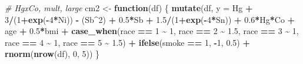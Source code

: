 \documentclass[12pt, twoside]{amherstthesis}
\newenvironment{Shaded}{\begin{snugshade}}{\end{snugshade}}
\newcommand{\AttributeTok}[1]{\textcolor[rgb]{0.13,0.29,0.53}{#1}}
\newcommand{\CommentTok}[1]{\textcolor[rgb]{0.56,0.35,0.01}{\textit{#1}}}
\newcommand{\ControlFlowTok}[1]{\textcolor[rgb]{0.13,0.29,0.53}{\textbf{#1}}}
\newcommand{\DecValTok}[1]{\textcolor[rgb]{0.00,0.00,0.81}{#1}}
\newcommand{\FloatTok}[1]{\textcolor[rgb]{0.00,0.00,0.81}{#1}}
\newcommand{\FunctionTok}[1]{\textcolor[rgb]{0.13,0.29,0.53}{\textbf{#1}}}
\newcommand{\NormalTok}[1]{#1}
\newcommand{\OtherTok}[1]{\textcolor[rgb]{0.56,0.35,0.01}{#1}}
\newcommand{\SpecialCharTok}[1]{\textcolor[rgb]{0.81,0.36,0.00}{\textbf{#1}}}
\begin{document}
\begin{Shaded}
\begin{Highlighting}[]
\CommentTok{\# HgxCo, mult, large}
\NormalTok{cm2 }\OtherTok{\textless{}{-}} \ControlFlowTok{function}\NormalTok{(df) \{}
  \FunctionTok{mutate}\NormalTok{(df, }\AttributeTok{y =} 
\NormalTok{           Hg }\SpecialCharTok{+} \DecValTok{3}\SpecialCharTok{/}\NormalTok{(}\DecValTok{1}\SpecialCharTok{+}\FunctionTok{exp}\NormalTok{(}\SpecialCharTok{{-}}\DecValTok{4}\SpecialCharTok{*}\NormalTok{Ni)) }\SpecialCharTok{{-}}\NormalTok{ (Sb}\SpecialCharTok{\^{}}\DecValTok{2}\NormalTok{) }\SpecialCharTok{+} \FloatTok{0.5}\SpecialCharTok{*}\NormalTok{Sb }\SpecialCharTok{+} \FloatTok{1.5}\SpecialCharTok{/}\NormalTok{(}\DecValTok{1}\SpecialCharTok{+}\FunctionTok{exp}\NormalTok{(}\SpecialCharTok{{-}}\DecValTok{4}\SpecialCharTok{*}\NormalTok{Sn)) }\SpecialCharTok{+} 
           \FloatTok{0.6}\SpecialCharTok{*}\NormalTok{Hg}\SpecialCharTok{*}\NormalTok{Co }\SpecialCharTok{+} 
\NormalTok{           age }\SpecialCharTok{+} \FloatTok{0.5}\SpecialCharTok{*}\NormalTok{bmi }\SpecialCharTok{+} 
           \FunctionTok{case\_when}\NormalTok{(race }\SpecialCharTok{==} \DecValTok{1} \SpecialCharTok{\textasciitilde{}} \DecValTok{1}\NormalTok{, }
\NormalTok{                     race }\SpecialCharTok{==} \DecValTok{2} \SpecialCharTok{\textasciitilde{}} \FloatTok{1.5}\NormalTok{, }
\NormalTok{                     race }\SpecialCharTok{==} \DecValTok{3} \SpecialCharTok{\textasciitilde{}} \DecValTok{1}\NormalTok{, }
\NormalTok{                     race }\SpecialCharTok{==} \DecValTok{4} \SpecialCharTok{\textasciitilde{}} \DecValTok{1}\NormalTok{, }
\NormalTok{                     race }\SpecialCharTok{==} \DecValTok{5} \SpecialCharTok{\textasciitilde{}} \FloatTok{1.5}\NormalTok{) }\SpecialCharTok{+}
           \FunctionTok{ifelse}\NormalTok{(smoke }\SpecialCharTok{==} \DecValTok{1}\NormalTok{, }\SpecialCharTok{{-}}\DecValTok{1}\NormalTok{, }\FloatTok{0.5}\NormalTok{) }\SpecialCharTok{+}
           \FunctionTok{rnorm}\NormalTok{(}\FunctionTok{nrow}\NormalTok{(df), }\DecValTok{0}\NormalTok{, }\DecValTok{5}\NormalTok{))}
\NormalTok{\}}


\end{Highlighting}
\end{Shaded}
\end{document}
